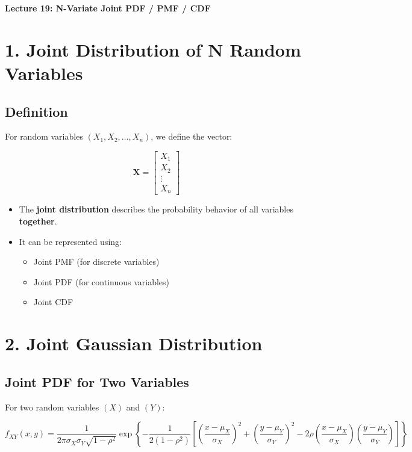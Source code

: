 \documentclass[12pt]{article}
\begin{document}
\begin{center}
    {\LARGE \textbf{Lecture 19: N-Variate Joint PDF / PMF / CDF}}
\end{center}

\section*{1. Joint Distribution of N Random Variables}

\subsection*{Definition}

For random variables $(X_1, X_2, \dots, X_n)$, we define the vector:

\[
\mathbf{X} =
\begin{bmatrix}
X_1 \\
X_2 \\
\vdots \\
X_n
\end{bmatrix}
\]

\begin{itemize}
    \item The \textbf{joint distribution} describes the probability behavior of all variables \textbf{together}.
    \item It can be represented using:
    \begin{itemize}
        \item Joint PMF (for discrete variables)
        \item Joint PDF (for continuous variables)
        \item Joint CDF
    \end{itemize}
\end{itemize}

\section*{2. Joint Gaussian Distribution}

\subsection*{Joint PDF for Two Variables}

For two random variables $(X)$ and $(Y)$:

\[
f_{XY}(x,y) =
\frac{1}{2\pi \sigma_X \sigma_Y \sqrt{1 - \rho^2}}
\exp \left\{
-\frac{1}{2(1-\rho^2)} \left[
\left(\frac{x-\mu_X}{\sigma_X}\right)^2
+
\left(\frac{y-\mu_Y}{\sigma_Y}\right)^2
- 2\rho \left(\frac{x-\mu_X}{\sigma_X}\right)
\left(\frac{y-\mu_Y}{\sigma_Y}\right)
\right]
\right\}
\]
\end{document}
